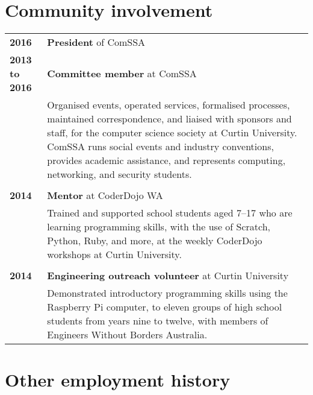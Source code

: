 \documentclass[a4paper,12pt]{article}
\begin{document}
\section*{Community involvement}

\begin{tabular}{p{35mm}p{125mm}}
	                    \textbf{2016}               & \textbf{President} of ComSSA
	\vspace{0.2em}  \\  \textbf{2013 to 2016}       & \textbf{Committee member} at ComSSA
	\vspace{0.2em}  \\                              & Organised events, operated services, formalised processes, maintained correspondence, and liaised with sponsors and staff, for the computer science society at Curtin University. ComSSA runs social events and industry conventions, provides academic assistance, and represents computing, networking, and security students.
	\\              \\  \textbf{2014}               & \textbf{Mentor} at CoderDojo WA
	\vspace{0.2em}  \\                              & Trained and supported school students aged 7--17 who are learning programming skills, with the use of Scratch, Python, Ruby, and more, at the weekly CoderDojo workshops at Curtin University.
	\\              \\  \textbf{2014}               & \textbf{Engineering outreach volunteer} at Curtin University
	\vspace{0.2em}  \\                              & Demonstrated introductory programming skills using the Raspberry Pi computer, to eleven groups of high school students from years nine to twelve, with members of Engineers Without Borders Australia.
\end{tabular}

\section*{Other employment history}
\end{document}
